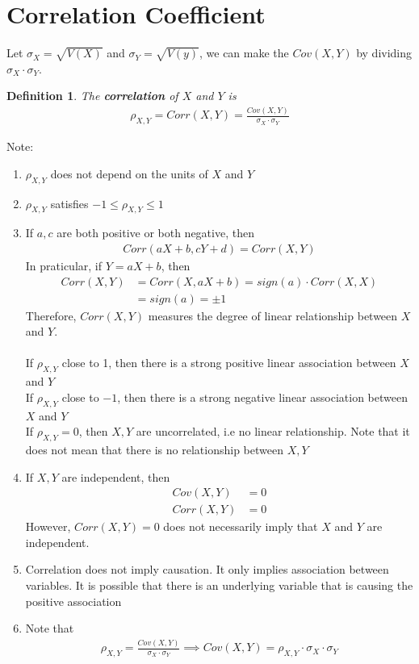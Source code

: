 \documentclass[11pt,oneside]{book}
\theoremstyle{newStyle}
\newtheorem{defn}[thm]{Definition}
\newcommand{\note}{\color{red}Note: \color{black}}
\begin{document}
\section[Correlation Coefficient]{Correlation Coefficient}
Let $\sigma_X=\sqrt{V(X)}$ and $\sigma_Y=\sqrt{V(y)}$, we can make the $Cov(X,Y)$ by dividing $\sigma_X\cdot \sigma_Y$. \begin{defn}
The \textbf{correlation} of $X$ and $Y$ is \begin{align*}
\rho_{X,Y}=Corr(X,Y)=\frac{Cov(X,Y)}{\sigma_X\cdot \sigma_Y}
\end{align*}
\end{defn}
\note \begin{enumerate}
\item $\rho_{X,Y}$ does not depend on the units of $X$ and $Y$
\item $\rho_{X,Y}$ satisfies $-1\leq \rho_{X,Y}\leq 1$
\item If $a,c$ are both positive or both negative, then \begin{align*}
Corr(aX+b,cY+d)=Corr(X,Y)
\end{align*}
In praticular, if $Y=aX+b$, then \begin{align*}
Corr(X,Y)&=Corr(X,aX+b)=sign(a)\cdot Corr(X,X)\\
&=sign(a)=\pm 1
\end{align*}
Therefore, $Corr(X,Y)$ measures the degree of linear relationship between $X$ and $Y$.\\
\hfill\\
If $\rho_{X,Y}$ close to 1, then there is a strong positive linear association between $X$ and $Y$\\
If $\rho_{X,Y}$ close to $-1$, then there is a strong negative linear association between $X$ and $Y$\\
If $\rho_{X,Y}=0$, then $X,Y$ are uncorrelated, i.e no linear relationship. Note that it does not mean that there is no relationship between $X,Y$ 
\item If $X,Y$ are independent, then \begin{align*}
Cov(X,Y)&=0\\
Corr(X,Y)&=0
\end{align*}
However, $Corr(X,Y)=0$ does not necessarily imply that $X$ and $Y$ are independent.
\item Correlation does not imply causation. It only implies association between variables. It is  possible that there is an underlying variable that is causing the positive association
\item Note that \begin{align*}
\rho_{X,Y}=\frac{Cov(X,Y)}{\sigma_X\cdot \sigma_Y}\implies Cov(X,Y)=\rho_{X,Y}\cdot \sigma_X\cdot \sigma_Y
\end{align*}
\end{enumerate}
\end{document}
